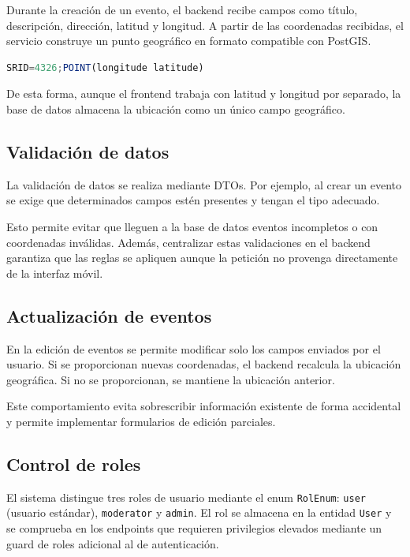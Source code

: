 Durante la creación de un evento, el backend recibe campos como título, descripción, dirección, latitud y longitud. A partir de las coordenadas recibidas, el servicio construye un punto geográfico en formato compatible con PostGIS.

\begin{lstlisting}[language=JavaScript, caption={Construcción conceptual de la ubicación geográfica de un evento}]
SRID=4326;POINT(longitude latitude)
\end{lstlisting}

De esta forma, aunque el frontend trabaja con latitud y longitud por separado, la base de datos almacena la ubicación como un único campo geográfico.

\subsection{Validación de datos}

La validación de datos se realiza mediante DTOs. Por ejemplo, al crear un evento se exige que determinados campos estén presentes y tengan el tipo adecuado.

Esto permite evitar que lleguen a la base de datos eventos incompletos o con coordenadas inválidas. Además, centralizar estas validaciones en el backend garantiza que las reglas se apliquen aunque la petición no provenga directamente de la interfaz móvil.

\subsection{Actualización de eventos}

En la edición de eventos se permite modificar solo los campos enviados por el usuario. Si se proporcionan nuevas coordenadas, el backend recalcula la ubicación geográfica. Si no se proporcionan, se mantiene la ubicación anterior.

Este comportamiento evita sobrescribir información existente de forma accidental y permite implementar formularios de edición parciales.

\subsection{Control de roles}

El sistema distingue tres roles de usuario mediante el enum \texttt{RolEnum}: \texttt{user} (usuario estándar), \texttt{moderator} y \texttt{admin}. El rol se almacena en la entidad \texttt{User} y se comprueba en los endpoints que requieren privilegios elevados mediante un guard de roles adicional al de autenticación.

